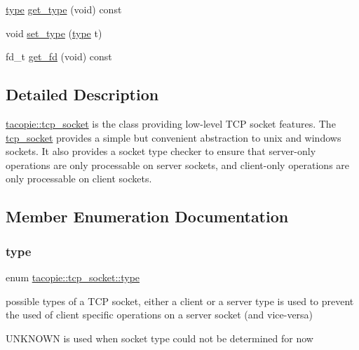 \begin{DoxyCompactItemize}
\item 
\hyperlink{classtacopie_1_1tcp__socket_ad8376e85df96ab9523f5d079ed7172ab}{type} \hyperlink{classtacopie_1_1tcp__socket_a4f663be51b845520505bc20a88b411ee}{get\+\_\+type} (void) const
\item 
void \hyperlink{classtacopie_1_1tcp__socket_a89be86ab254eec3fc16eedfba8b16fb2}{set\+\_\+type} (\hyperlink{classtacopie_1_1tcp__socket_ad8376e85df96ab9523f5d079ed7172ab}{type} t)
\item 
fd\+\_\+t \hyperlink{classtacopie_1_1tcp__socket_a4fd367a1802ed6ae7fa0e33fc07ed255}{get\+\_\+fd} (void) const
\end{DoxyCompactItemize}


\subsection{Detailed Description}
\hyperlink{classtacopie_1_1tcp__socket}{tacopie\+::tcp\+\_\+socket} is the class providing low-\/level T\+CP socket features. The \hyperlink{classtacopie_1_1tcp__socket}{tcp\+\_\+socket} provides a simple but convenient abstraction to unix and windows sockets. It also provides a socket type checker to ensure that server-\/only operations are only processable on server sockets, and client-\/only operations are only processable on client sockets. 

\subsection{Member Enumeration Documentation}
\mbox{\label{classtacopie_1_1tcp__socket_ad8376e85df96ab9523f5d079ed7172ab}} 
\subsubsection{\texorpdfstring{type}{type}}
{\footnotesize\ttfamily enum \hyperlink{classtacopie_1_1tcp__socket_ad8376e85df96ab9523f5d079ed7172ab}{tacopie\+::tcp\+\_\+socket\+::type}\hspace{0.3cm}{\ttfamily [strong]}}

possible types of a T\+CP socket, either a client or a server type is used to prevent the used of client specific operations on a server socket (and vice-\/versa)

U\+N\+K\+N\+O\+WN is used when socket type could not be determined for now 


